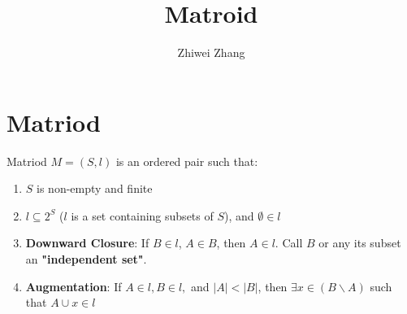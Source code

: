 \documentclass[12pt]{article}
\begin{document}
	
	
	
	\title{Matroid}
	\author{Zhiwei Zhang}
	
	\maketitle
	
	\section{Matriod}
	Matriod $M = (S, l)$ is an ordered pair such that: 
	\begin{enumerate}
		\item $S$ is non-empty and finite
		\item $l \subseteq 2^{S}$ ($l$ is a set containing subsets of $S$), and $\emptyset \in l$
		\item \textbf{Downward Closure}: If $B \in l$, $A \in B$, then $A \in l$. Call $B$ or any its subset an \textbf{"independent set"}.
		\item \textbf{Augmentation}: If $A \in l, B \in l,$ and $|A| < |B|$, then $\exists x \in (B \backslash A)$ such that $A \cup {x} \in l$
	\end{enumerate}
	
\end{document}
